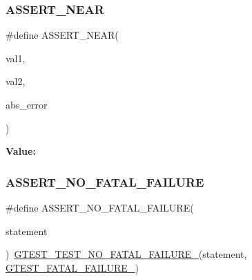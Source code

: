 \subsubsection{\texorpdfstring{ASSERT\_NEAR}{ASSERT\_NEAR}}
{\footnotesize\ttfamily \#define A\+S\+S\+E\+R\+T\+\_\+\+N\+E\+AR(\begin{DoxyParamCaption}\item[{}]{val1,  }\item[{}]{val2,  }\item[{}]{abs\+\_\+error }\end{DoxyParamCaption})}

{\bfseries Value\+:}
\begin{DoxyCode}{0}

\end{DoxyCode}
\mbox{\label{_obj__test_2lib_2googletest-release-1_88_81_2googletest_2include_2gtest_2gtest_8h_a5034fda3490aad5a93942ac83f4cea49}} 
\subsubsection{\texorpdfstring{ASSERT\_NO\_FATAL\_FAILURE}{ASSERT\_NO\_FATAL\_FAILURE}}
{\footnotesize\ttfamily \#define A\+S\+S\+E\+R\+T\+\_\+\+N\+O\+\_\+\+F\+A\+T\+A\+L\+\_\+\+F\+A\+I\+L\+U\+RE(\begin{DoxyParamCaption}\item[{}]{statement }\end{DoxyParamCaption})~\mbox{\hyperlink{_obj__test_2lib_2googletest-release-1_88_81_2googletest_2include_2gtest_2internal_2gtest-internal_8h_a1b37a3c446836d33040f3266a6236081}{G\+T\+E\+S\+T\+\_\+\+T\+E\+S\+T\+\_\+\+N\+O\+\_\+\+F\+A\+T\+A\+L\+\_\+\+F\+A\+I\+L\+U\+R\+E\+\_\+}}(statement, \mbox{\hyperlink{_obj__test_2lib_2googletest-release-1_88_81_2googletest_2include_2gtest_2internal_2gtest-internal_8h_a0f9a4c3ea82cc7bf4478eaffdc168358}{G\+T\+E\+S\+T\+\_\+\+F\+A\+T\+A\+L\+\_\+\+F\+A\+I\+L\+U\+R\+E\+\_\+}})}


